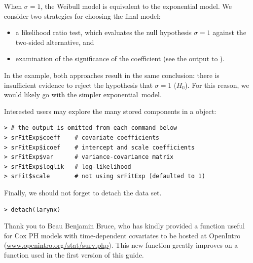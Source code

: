 \documentclass[11pt]{article}
\begin{document}
When $\sigma=1$, the Weibull model is equivalent to the exponential model. We consider two strategies for choosing the final model:
\begin{itemize}
\item a likelihood ratio test, which evaluates the null hypothesis $\sigma=1$ against the two-sided alternative, and
\item examination of the significance of the  coefficient (see the output to ).
\end{itemize}
In the example, both approaches result in the same conclusion: there is insufficient evidence to reject the hypothesis that $\sigma=1$ ($H_0$). For this reason, we would likely go with the simpler exponential~model.

Interested users may explore the many stored components in a  object:
{\color{verbatimrcom}\begin{verbatim}
> # the output is omitted from each command below
> srFitExp$coeff    # covariate coefficients
> srFitExp$icoef    # intercept and scale coefficients
> srFitExp$var      # variance-covariance matrix
> srFitExp$loglik   # log-likelihood
> srFit$scale       # not using srFitExp (defaulted to 1)
\end{verbatim}}
Finally, we should not forget to detach the data set.
{\color{verbatimrcom}\begin{verbatim}
> detach(larynx)
\end{verbatim}}

\pagebreak







\vspace{4mm}

Thank you to Beau Benjamin Bruce, who has kindly provided a function useful for Cox PH models with time-dependent covariates to be hosted at OpenIntro (\href{http://www.openintro.org/stat/surv.php}{www.openintro.org/stat/surv.php}). This new function greatly improves on a function used in the first version of this guide.
\end{document}
